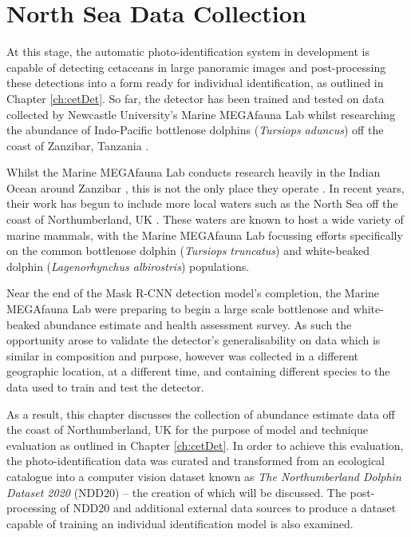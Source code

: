 \chapter{North Sea Data Collection} \label{ch:NDD}

At this stage, the automatic photo-identification system in development is capable of detecting cetaceans in large panoramic images and post-processing these detections into a form ready for individual identification, as outlined in Chapter \ref{ch:cetDet}. So far, the detector has been trained and tested on data collected by Newcastle University's Marine MEGAfauna Lab whilst researching the abundance of Indo-Pacific bottlenose dolphins (\textit{Tursiops aduncus}) off the coast of Zanzibar, Tanzania \cite{sharpe_indian_2019}. 

Whilst the Marine MEGAfauna Lab conducts research heavily in the Indian Ocean around Zanzibar \cite{yang_description_2020, temple_life-history_2020, temple_marine_2019, temple_marine_2018, weigmann_revision_2020, barrowclift_social_2017}, this is not the only place they operate \cite{temple_by-catch_2021, yang_classification_2017, yang_influence_2022}. In recent years, their work has begun to include more local waters such as the North Sea off the coast of Northumberland, UK \cite{van_bressem_visual_2018, yang_characterization_2021}. These waters are known to host a wide variety of marine mammals, with the Marine MEGAfauna Lab focussing efforts specifically on the common bottlenose dolphin (\textit{Tursiops truncatus}) and white-beaked dolphin (\textit{Lagenorhynchus albirostris}) populations.

Near the end of the Mask R-CNN detection model's completion, the Marine MEGAfauna Lab were preparing to begin a large scale bottlenose and white-beaked abundance estimate and health assessment survey. As such the opportunity arose to validate the detector's generalisability on data which is similar in composition and purpose, however was collected in a different geographic location, at a different time, and containing different species to the data used to train and test the detector.

As a result, this chapter discusses the collection of abundance estimate data off the coast of Northumberland, UK for the purpose of model and technique evaluation as outlined in Chapter \ref{ch:cetDet}. In order to achieve this evaluation, the photo-identification data was curated and transformed from an ecological catalogue into a computer vision dataset known as \textit{The Northumberland Dolphin Dataset 2020} (NDD20) -- the creation of which will be discussed. The post-processing of NDD20 and additional external data sources to produce a dataset capable of training an individual identification model is also examined. 

